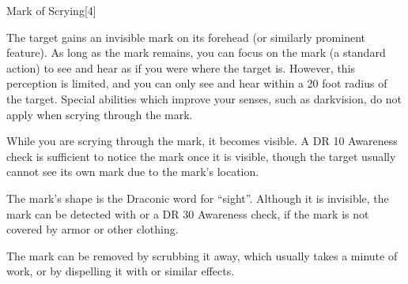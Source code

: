 \begin{spellsection}{Mark of Scrying}[4]
    \begin{spellheader}
    \end{spellheader}
    \begin{spellcontent}
        \begin{spelltargetinginfo}
        \end{spelltargetinginfo}
        \begin{spelleffects}
            \spelleffect The target gains an invisible mark on its forehead (or similarly prominent feature).
            As long as the mark remains, you can focus on the mark (a standard action) to see and hear as if you were where the target is.
            However, this perception is limited, and you can only see and hear within a 20 foot radius of the target.
            Special abilities which improve your senses, such as darkvision, do not apply when scrying through the mark.

            While you are scrying through the mark, it becomes visible.
            A DR 10 Awareness check is sufficient to notice the mark once it is visible, though the target usually cannot see its own mark due to the mark's location.
            \spelldur \durlong
        \end{spelleffects}
    \end{spellcontent}
    \begin{spellfooter}
        \spellnotes The mark's shape is the Draconic word for ``sight''.
        Although it is invisible, the mark can be detected with  or a DR 30 Awareness check, if the mark is not covered by armor or other clothing.

        The mark can be removed by scrubbing it away, which usually takes a minute of work, or by dispelling it with  or similar effects.
        \miscastrandom
    \end{spellfooter}
    \begin{spellaugments}
    \end{spellaugments}
\end{spellsection}

